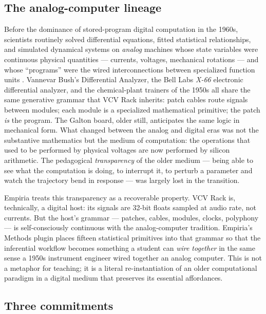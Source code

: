 \subsection{The analog-computer
lineage}\label{the-analog-computer-lineage}

Before the dominance of stored-program digital computation in the 1960s,
scientists routinely solved differential equations, fitted statistical
relationships, and simulated dynamical systems on \emph{analog} machines
whose state variables were continuous physical quantities --- currents,
voltages, mechanical rotations --- and whose ``programs'' were the wired
interconnections between specialized function units \citep{small2001}.
Vannevar Bush's Differential Analyzer, the Bell Labs \emph{X-66}
electronic differential analyzer, and the chemical-plant trainers of the
1950s all share the same generative grammar that VCV Rack inherits:
patch cables route signals between modules; each module is a specialized
mathematical primitive; the patch \emph{is} the program. The Galton
board, older still, anticipates the same logic in mechanical form. What
changed between the analog and digital eras was not the substantive
mathematics but the medium of computation: the operations that used to
be performed by physical voltages are now performed by silicon
arithmetic. The pedagogical \emph{transparency} of the older medium ---
being able to see what the computation is doing, to interrupt it, to
perturb a parameter and watch the trajectory bend in response --- was
largely lost in the transition.

Empiria treats this transparency as a recoverable property. VCV Rack is,
technically, a digital host: its signals are 32-bit floats sampled at
audio rate, not currents. But the host's grammar --- patches, cables,
modules, clocks, polyphony --- is self-consciously continuous with the
analog-computer tradition. Empiria's Methods plugin places fifteen
statistical primitives into that grammar so that the inferential
workflow becomes something a student can \emph{wire together} in the
same sense a 1950s instrument engineer wired together an analog
computer. This is not a metaphor for teaching; it is a literal
re-instantiation of an older computational paradigm in a digital medium
that preserves its essential affordances.

\subsection{Three commitments}\label{three-commitments}

